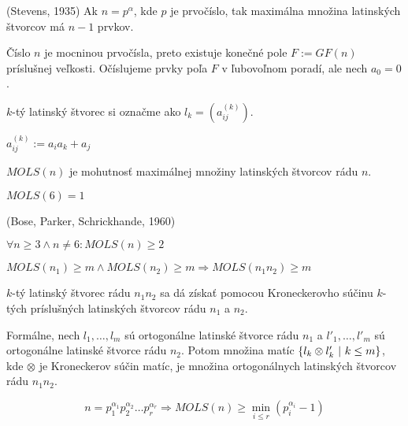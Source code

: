 \begin{theorem}{(Stevens, 1935)}
Ak $n = p^\alpha$, kde $p$ je prvočíslo, tak maximálna množina latinských štvorcov má $n-1$ prvkov.
\end{theorem}

\begin{construction}
Číslo $n$ je mocninou prvočísla, preto existuje konečné pole $F := GF(n)$ príslušnej veľkosti. 
Očíslujeme prvky poľa $F$ v ľubovoľnom poradí, ale nech $a_0 = 0$.

$k$-tý latinský štvorec si označme ako $l_k = \left(a_{ij}^{(k)}\right)$.

$a_{ij}^{(k)} := a_i a_k + a_j$

\end{construction}

\begin{definition}
$MOLS(n)$ je mohutnosť maximálnej množiny latinských štvorcov rádu $n$.
\end{definition}

\begin{remark}
$MOLS(6) = 1$
\end{remark}

\begin{theorem_hard}{(Bose, Parker, Schrickhande, 1960)}

$\forall n \geq 3 \wedge n \neq 6: MOLS(n) \geq 2$

\end{theorem_hard}

\begin{theorem}
$MOLS(n_1) \geq m \wedge MOLS(n_2) \geq m \Rightarrow MOLS(n_1 n_2) \geq m$
\end{theorem}

\begin{construction}
$k$-tý latinský štvorec rádu $n_1 n_2$ sa dá získať pomocou Kroneckerovho súčinu $k$-tých príslušných latinských štvorcov rádu $n_1$ a $n_2$.

Formálne, nech $l_1, \ldots, l_m$ sú ortogonálne latinské štvorce rádu $n_1$ a $l'_1, \ldots, l'_m$ sú ortogonálne latinské štvorce rádu $n_2$.
Potom množina matíc $\left\{l_k \otimes l'_k ~|~ k \leq m\right\}$, kde $\otimes$ je Kroneckerov súčin matíc, je množina ortogonálnych latinských štvorcov rádu $n_1 n_2$.
\end{construction}

\begin{corollary}
$$n = p_1^{\alpha_1} p_2^{\alpha_2} \ldots p_r^{\alpha_r} \Rightarrow MOLS(n) \geq \min_{i \leq r} (p_i^{\alpha_i} - 1)$$
\end{corollary}

